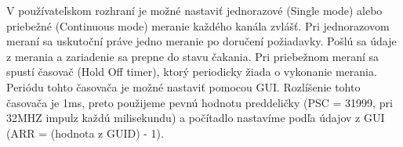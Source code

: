 \documentclass[main.tex]{subfiles}
\begin{document}
	V používateľskom rozhraní je možné nastaviť jednorazové (Single mode) alebo priebežné (Continuous mode) meranie každého kanála zvlášť. Pri jednorazovom meraní sa uskutoční práve jedno meranie po doručení požiadavky. Pošlú sa údaje z merania a zariadenie sa prepne do stavu čakania. Pri priebežnom meraní sa spustí časovač (Hold Off timer), ktorý periodicky žiada o vykonanie merania. Periódu tohto časovača je možné nastaviť pomocou GUI. Rozlíšenie tohto časovača je 1ms, preto použijeme pevnú hodnotu preddeličky (PSC = 31999, pri 32MHZ impulz každú milisekundu) a počítadlo nastavíme podľa údajov z GUI (ARR = (hodnota z GUID) - 1). 
	
	
\end{document}
